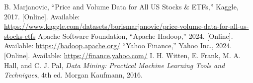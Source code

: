 \documentclass[12pt,a4paper]{article}
\begin{document}
\begin{thebibliography}{00}
 B. Marjanovic, ``Price and Volume Data for All US Stocks \& ETFs,'' Kaggle, 2017. [Online]. Available: \url{https://www.kaggle.com/datasets/borismarjanovic/price-volume-data-for-all-us-stocks-etfs}
 Apache Software Foundation, ``Apache Hadoop,'' 2024. [Online]. Available: \url{https://hadoop.apache.org/}
 ``Yahoo Finance,'' Yahoo Inc., 2024. [Online]. Available: \url{https://finance.yahoo.com/}
 I. H. Witten, E. Frank, M. A. Hall, and C. J. Pal, \textit{Data Mining: Practical Machine Learning Tools and Techniques}, 4th ed. Morgan Kaufmann, 2016.
\end{thebibliography}
\end{document}
